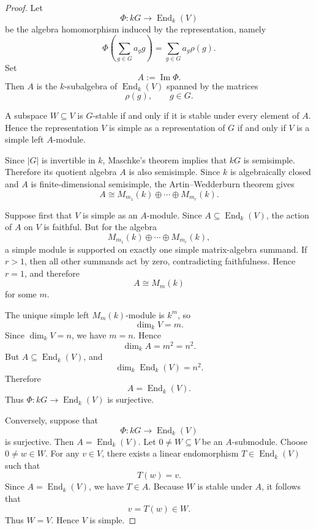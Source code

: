     \begin{proof}
        Let
        \[
            \Phi : kG \longrightarrow \operatorname{End}_k(V)
        \]
        be the algebra homomorphism induced by the representation, namely
        \[
            \Phi\left(\sum_{g\in G} a_g g\right)
            =
            \sum_{g\in G} a_g \rho(g).
        \]
        Set
        \[
            A := \operatorname{Im}\Phi.
        \]
        Then \(A\) is the \(k\)-subalgebra of \(\operatorname{End}_k(V)\) spanned by the
        matrices
        \[
            \rho(g), \qquad g\in G.
        \]
        
        A subspace \(W\subseteq V\) is \(G\)-stable if and only if it is stable under every
        element of \(A\). Hence the representation \(V\) is simple as a representation of
        \(G\) if and only if \(V\) is a simple left \(A\)-module.
        
        Since \(|G|\) is invertible in \(k\), Maschke's theorem implies that \(kG\) is
        semisimple. Therefore its quotient algebra \(A\) is also semisimple. Since \(k\) is
        algebraically closed and \(A\) is finite-dimensional semisimple, the Artin--Wedderburn
        theorem gives
        \[
            A \cong
            M_{m_1}(k)\oplus \cdots \oplus M_{m_r}(k).
        \]
        
        Suppose first that \(V\) is simple as an \(A\)-module. Since \(A\subseteq
        \operatorname{End}_k(V)\), the action of \(A\) on \(V\) is faithful. But for the algebra
        \[
            M_{m_1}(k)\oplus \cdots \oplus M_{m_r}(k),
        \]
        a simple module is supported on exactly one simple matrix-algebra summand. If \(r>1\),
        then all other summands act by zero, contradicting faithfulness. Hence \(r=1\), and
        therefore
        \[
            A \cong M_m(k)
        \]
        for some \(m\).
        
        The unique simple left \(M_m(k)\)-module is \(k^m\), so
        \[
            \dim_k V = m.
        \]
        Since \(\dim_k V=n\), we have \(m=n\). Hence
        \[
            \dim_k A = m^2 = n^2.
        \]
        But \(A\subseteq \operatorname{End}_k(V)\), and
        \[
            \dim_k \operatorname{End}_k(V)=n^2.
        \]
        Therefore
        \[
            A=\operatorname{End}_k(V).
        \]
        Thus \(\Phi:kG\to \operatorname{End}_k(V)\) is surjective.
        
        Conversely, suppose that
        \[
            \Phi:kG\longrightarrow \operatorname{End}_k(V)
        \]
        is surjective. Then \(A=\operatorname{End}_k(V)\). Let \(0\neq W\subseteq V\) be an
        \(A\)-submodule. Choose \(0\neq w\in W\). For any \(v\in V\), there exists a linear
        endomorphism \(T\in \operatorname{End}_k(V)\) such that
        \[
            T(w)=v.
        \]
        Since \(A=\operatorname{End}_k(V)\), we have \(T\in A\). Because \(W\) is stable under
        \(A\), it follows that
        \[
            v=T(w)\in W.
        \]
        Thus \(W=V\). Hence \(V\) is simple.
        

\end{proof}
